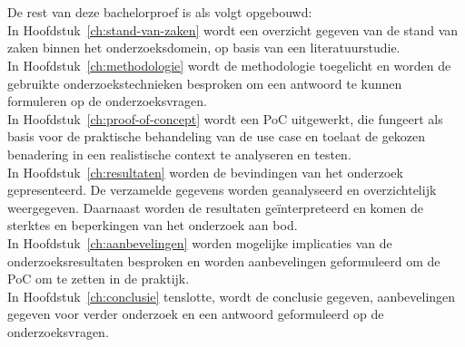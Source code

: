 \section{}%
\label{sec:opzet-bachelorproef}

De rest van deze bachelorproef is als volgt opgebouwd:
\\[1em]
In Hoofdstuk~\ref{ch:stand-van-zaken} wordt een overzicht gegeven van de stand van zaken binnen het onderzoeksdomein, op basis van een literatuurstudie.
\\[1em]
In Hoofdstuk~\ref{ch:methodologie} wordt de methodologie toegelicht en worden de gebruikte onderzoekstechnieken besproken om een antwoord te kunnen formuleren op de onderzoeksvragen.
\\[1em]
In Hoofdstuk~\ref{ch:proof-of-concept} wordt een PoC uitgewerkt, die fungeert als basis voor de praktische behandeling van de use case en toelaat de gekozen benadering in een realistische context te analyseren en testen.
\\[1em]
In Hoofdstuk~\ref{ch:resultaten} worden de bevindingen van het onderzoek gepresenteerd. De verzamelde gegevens worden geanalyseerd en overzichtelijk weergegeven. Daarnaast worden de resultaten geïnterpreteerd en komen de sterktes en beperkingen van het onderzoek aan bod.
\\[1em]
In Hoofdstuk~\ref{ch:aanbevelingen} worden mogelijke implicaties van de onderzoeksresultaten besproken en worden aanbevelingen geformuleerd om de PoC om te zetten in de praktijk.
\\[1em]
In Hoofdstuk~\ref{ch:conclusie} tenslotte, wordt de conclusie gegeven, aanbevelingen gegeven voor verder onderzoek en een antwoord geformuleerd op de onderzoeksvragen.